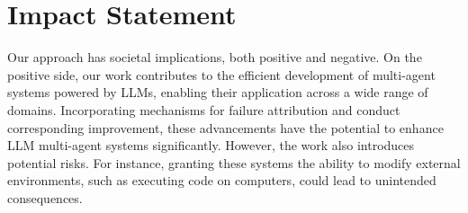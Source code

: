 \documentclass{article}
\begin{document}
\printAffiliationsAndNotice{\icmlEqualContribution} %










\clearpage
\newpage
\section*{Impact Statement}

Our approach has societal implications, both positive and negative.
On the positive side, our work contributes to the efficient development of multi-agent systems powered by LLMs, enabling their application across a wide range of domains. 
Incorporating mechanisms for failure attribution and conduct corresponding improvement, these advancements have the potential to enhance LLM multi-agent systems significantly.
However, the work also introduces potential risks. 
For instance, granting these systems the ability to modify external environments, such as executing code on computers, could lead to unintended consequences. 




\end{document}
